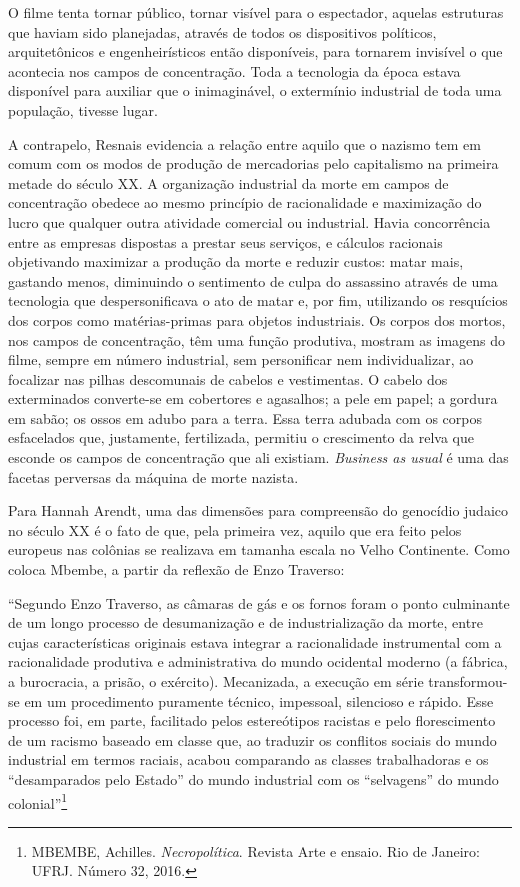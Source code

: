O filme tenta tornar público, tornar visível para o espectador, aquelas
estruturas que haviam sido planejadas, através de todos os dispositivos
políticos, arquitetônicos e engenheirísticos então disponíveis, para
tornarem invisível o que acontecia nos campos de concentração. Toda a
tecnologia da época estava disponível para auxiliar que o inimaginável,
o extermínio industrial de toda uma população, tivesse lugar.

A contrapelo, Resnais evidencia a relação entre aquilo que o nazismo tem
em comum com os modos de produção de mercadorias pelo capitalismo na
primeira metade do século XX. A organização industrial da morte em
campos de concentração obedece ao mesmo princípio de racionalidade e
maximização do lucro que qualquer outra atividade comercial ou
industrial. Havia concorrência entre as empresas dispostas a prestar
seus serviços, e cálculos racionais objetivando maximizar a produção da
morte e reduzir custos: matar mais, gastando menos, diminuindo o
sentimento de culpa do assassino através de uma tecnologia que
despersonificava o ato de matar e, por fim, utilizando os resquícios dos
corpos como matérias-primas para objetos industriais. Os corpos dos
mortos, nos campos de concentração, têm uma função produtiva, mostram as
imagens do filme, sempre em número industrial, sem personificar nem
individualizar, ao focalizar nas pilhas descomunais de cabelos e
vestimentas. O cabelo dos exterminados converte-se em cobertores e
agasalhos; a pele em papel; a gordura em sabão; os ossos em adubo para a
terra. Essa terra adubada com os corpos esfacelados que, justamente,
fertilizada, permitiu o crescimento da relva que esconde os campos de
concentração que ali existiam. \emph{Business as usual} é uma das
facetas perversas da máquina de morte nazista.

Para Hannah Arendt, uma das dimensões para compreensão do genocídio
judaico no século XX é o fato de que, pela primeira vez, aquilo que era
feito pelos europeus nas colônias se realizava em tamanha escala no
Velho Continente. Como coloca Mbembe, a partir da reflexão de Enzo
Traverso:

``Segundo Enzo Traverso, as câmaras de gás e os fornos foram o ponto
culminante de um longo processo de desumanização e de industrialização
da morte, entre cujas características originais estava integrar a
racionalidade instrumental com a racionalidade produtiva e
administrativa do mundo ocidental moderno (a fábrica, a burocracia, a
prisão, o exército). Mecanizada, a execução em série transformou-se em
um procedimento puramente técnico, impessoal, silencioso e rápido. Esse
processo foi, em parte, facilitado pelos estereótipos racistas e pelo
florescimento de um racismo baseado em classe que, ao traduzir os
conflitos sociais do mundo industrial em termos raciais, acabou
comparando as classes trabalhadoras e os ``desamparados pelo Estado'' do
mundo industrial com os ``selvagens'' do mundo colonial''\footnote{MBEMBE,
  Achilles. \emph{Necropolítica}. Revista Arte e ensaio. Rio de Janeiro:
  UFRJ. Número 32, 2016.}

